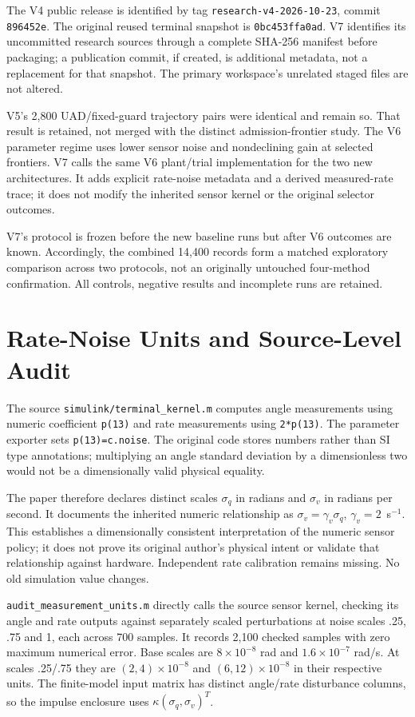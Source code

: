 \documentclass[10pt,journal]{IEEEtran}
\begin{document}
The V4 public release is identified by tag \texttt{research-v4-2026-10-23}, commit \texttt{896452e}. The original reused terminal snapshot is \texttt{0bc453ffa0ad}. V7 identifies its uncommitted research sources through a complete SHA-256 manifest before packaging; a publication commit, if created, is additional metadata, not a replacement for that snapshot. The primary workspace's unrelated staged files are not altered.

V5's 2,800 UAD/fixed-guard trajectory pairs were identical and remain so. That result is retained, not merged with the distinct admission-frontier study. The V6 parameter regime uses lower sensor noise and nondeclining gain at selected frontiers. V7 calls the same V6 plant/trial implementation for the two new architectures. It adds explicit rate-noise metadata and a derived measured-rate trace; it does not modify the inherited sensor kernel or the original selector outcomes.

V7's protocol is frozen before the new baseline runs but after V6 outcomes are known. Accordingly, the combined 14,400 records form a matched exploratory comparison across two protocols, not an originally untouched four-method confirmation. All controls, negative results and incomplete runs are retained.

\section{Rate-Noise Units and Source-Level Audit}
The source \texttt{simulink/terminal\_kernel.m} computes angle measurements using numeric coefficient \texttt{p(13)} and rate measurements using \texttt{2*p(13)}. The parameter exporter sets \texttt{p(13)=c.noise}. The original code stores numbers rather than SI type annotations; multiplying an angle standard deviation by a dimensionless two would not be a dimensionally valid physical equality.

The paper therefore declares distinct scales $\sigma_q$ in radians and $\sigma_v$ in radians per second. It documents the inherited numeric relationship as $\sigma_v=\gamma_v\sigma_q$, $\gamma_v=2$~s$^{-1}$. This establishes a dimensionally consistent interpretation of the numeric sensor policy; it does not prove its original author's physical intent or validate that relationship against hardware. Independent rate calibration remains missing. No old simulation value changes.

\texttt{audit\_measurement\_units.m} directly calls the source sensor kernel, checking its angle and rate outputs against separately scaled perturbations at noise scales .25, .75 and 1, each across 700 samples. It records 2,100 checked samples with zero maximum numerical error. Base scales are $8\times10^{-8}$ rad and $1.6\times10^{-7}$ rad/s. At scales .25/.75 they are $(2,4)\times10^{-8}$ and $(6,12)\times10^{-8}$ in their respective units. The finite-model input matrix has distinct angle/rate disturbance columns, so the impulse enclosure uses $\kappa(\sigma_q,\sigma_v)^T$.
\end{document}
